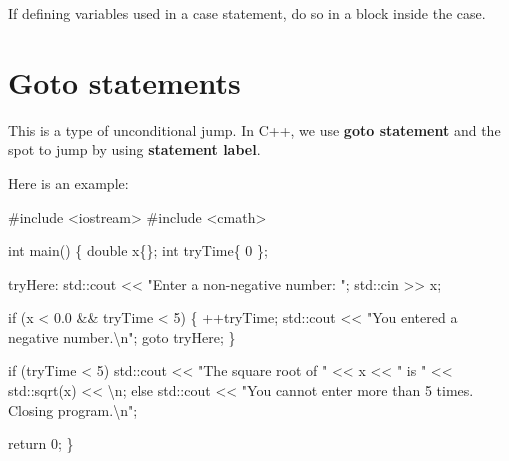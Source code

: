 \documentclass[
  letterpaper,
  DIV=11,
  numbers=noendperiod]{scrreprt}
\newenvironment{Shaded}{\begin{snugshade}}{\end{snugshade}}
\newcommand{\CommentTok}[1]{\textcolor[rgb]{0.37,0.37,0.37}{#1}}
\newcommand{\ControlFlowTok}[1]{\textcolor[rgb]{0.00,0.23,0.31}{#1}}
\newcommand{\DecValTok}[1]{\textcolor[rgb]{0.68,0.00,0.00}{#1}}
\newcommand{\ErrorTok}[1]{\textcolor[rgb]{0.68,0.00,0.00}{#1}}
\newcommand{\FloatTok}[1]{\textcolor[rgb]{0.68,0.00,0.00}{#1}}
\newcommand{\FunctionTok}[1]{\textcolor[rgb]{0.28,0.35,0.67}{#1}}
\newcommand{\NormalTok}[1]{\textcolor[rgb]{0.00,0.23,0.31}{#1}}
\newcommand{\SpecialCharTok}[1]{\textcolor[rgb]{0.37,0.37,0.37}{#1}}
\newcommand{\StringTok}[1]{\textcolor[rgb]{0.13,0.47,0.30}{#1}}
\begin{document}
If defining variables used in a case statement, do so in a block inside
the case.

\hypertarget{goto-statements}{%
\section{Goto statements}\label{goto-statements}}

This is a type of unconditional jump. In C++, we use \textbf{goto
statement} and the spot to jump by using \textbf{statement label}.

Here is an example:

\begin{Shaded}
\begin{Highlighting}[]
\CommentTok{\#include \textless{}iostream\textgreater{}}
\CommentTok{\#include \textless{}cmath\textgreater{}}

\NormalTok{int }\FunctionTok{main}\NormalTok{()}
\NormalTok{\{}
\NormalTok{    double x\{\};}
\NormalTok{    int tryTime\{ }\DecValTok{0}\NormalTok{ \};}
    
\NormalTok{tryHere}\SpecialCharTok{:}
\NormalTok{    std}\SpecialCharTok{::}\NormalTok{cout }\SpecialCharTok{\textless{}}\ErrorTok{\textless{}} \StringTok{"Enter a non{-}negative number: "}\NormalTok{;}
\NormalTok{    std}\SpecialCharTok{::}\NormalTok{cin }\SpecialCharTok{\textgreater{}}\ErrorTok{\textgreater{}}\NormalTok{ x;}
    
    \ControlFlowTok{if}\NormalTok{ (x }\SpecialCharTok{\textless{}} \FloatTok{0.0} \SpecialCharTok{\&\&}\NormalTok{ tryTime }\SpecialCharTok{\textless{}} \DecValTok{5}\NormalTok{)}
\NormalTok{    \{}
        \SpecialCharTok{++}\NormalTok{tryTime;}
\NormalTok{        std}\SpecialCharTok{::}\NormalTok{cout }\SpecialCharTok{\textless{}}\ErrorTok{\textless{}} \StringTok{"You entered a negative number.}\SpecialCharTok{\textbackslash{}n}\StringTok{"}\NormalTok{;}
\NormalTok{        goto tryHere;}
\NormalTok{    \}}
        
    \ControlFlowTok{if}\NormalTok{ (tryTime }\SpecialCharTok{\textless{}} \DecValTok{5}\NormalTok{)}
\NormalTok{        std}\SpecialCharTok{::}\NormalTok{cout }\SpecialCharTok{\textless{}}\ErrorTok{\textless{}} \StringTok{"The square root of "} \SpecialCharTok{\textless{}}\ErrorTok{\textless{}}\NormalTok{ x }\SpecialCharTok{\textless{}}\ErrorTok{\textless{}} \StringTok{" is "} \SpecialCharTok{\textless{}}\ErrorTok{\textless{}}\NormalTok{ std}\SpecialCharTok{::}\FunctionTok{sqrt}\NormalTok{(x) }\SpecialCharTok{\textless{}}\ErrorTok{\textless{}} \StringTok{\textquotesingle{}}\SpecialCharTok{\textbackslash{}n}\StringTok{\textquotesingle{}}\NormalTok{;}
    \ControlFlowTok{else}
\NormalTok{        std}\SpecialCharTok{::}\NormalTok{cout }\SpecialCharTok{\textless{}}\ErrorTok{\textless{}} \StringTok{"You cannot enter more than 5 times. Closing program.}\SpecialCharTok{\textbackslash{}n}\StringTok{"}\NormalTok{;}

\NormalTok{    return }\DecValTok{0}\NormalTok{;}
\NormalTok{\}}
\end{Highlighting}
\end{Shaded}
\end{document}
